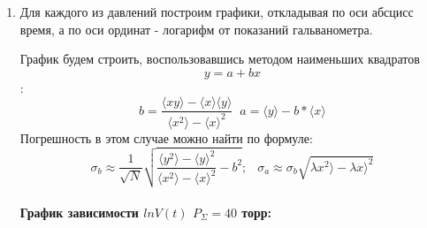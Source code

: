 \documentclass[a4paper,12pt]{article}
\begin{document}
\begin{enumerate}
\item Для каждого из давлений построим графики, откладывая по
оси абсцисс время, а по оси ординат - логарифм от показаний гальванометра.

График будем строить, воспользовавшись методом наименьших квадратов $$ y = a + bx $$:
\begin{equation}
b = \frac{\langle xy \rangle - \langle x \rangle \langle y \rangle}{\langle x^2 \rangle - \langle x \rangle^2} \;\;
a = \langle y \rangle - b* \langle x \rangle
\label{mnk}
\end{equation}
Погрешность в этом случае можно найти по формуле: 
\begin{equation}
\sigma_b \approx \frac{1}{\sqrt{N}}\sqrt{\frac{\langle y^2 \rangle - \langle y \rangle ^ 2}{\langle x^2 \rangle - \langle x \rangle ^ 2} - b^2} ;\;\;\ \sigma_a \approx \sigma_b\sqrt{\lambda x^2 \rangle - \lambda x \rangle ^2} 
\end{equation}
\paragraph{График зависимости $lnV(t)$ $P_{\Sigma} = 40$ торр:}


\end{enumerate}
\end{document}
